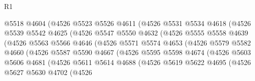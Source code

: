 \begin{lexlean}{R1}
\begin{coremodule}
                        @5518
                        @4604
                        (@4526
                          @5523
                          @5526
                          @4611
                          (@4526
                            @5531
                            @5534
                            @4618
                            (@4526
                              @5539
                              @5542
                              @4625
                              (@4526
                                @5547
                                @5550
                                @4632
                                (@4526
                                  @5555
                                  @5558
                                  @4639
                                  (@4526
                                    @5563
                                    @5566
                                    @4646
                                    (@4526
                                      @5571
                                      @5574
                                      @4653
                                      (@4526
                                        @5579
                                        @5582
                                        @4660
                                        (@4526
                                          @5587
                                          @5590
                                          @4667
                                          (@4526
                                            @5595
                                            @5598
                                            @4674
                                            (@4526
                                              @5603
                                              @5606
                                              @4681
                                              (@4526
                                                @5611
                                                @5614
                                                @4688
                                                (@4526
                                                  @5619
                                                  @5622
                                                  @4695
                                                  (@4526
                                                    @5627
                                                    @5630
                                                    @4702
                                                    (@4526

\end{coremodule}
\end{lexlean}
